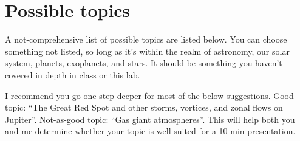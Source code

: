 \documentclass[11pt]{article}%
\begin{document}
\newpage\pagebreak

\section*{Possible topics}

A not-comprehensive list of possible topics are listed below. You can choose something not listed, so long as it's within the realm of astronomy, our solar system, planets, exoplanets, and stars.  It should be something you haven't covered in depth in class or this lab.

I recommend you go one step deeper for most of the below suggestions. Good topic: ``The Great Red Spot and other storms, vortices, and zonal flows on Jupiter''. Not-as-good topic: ``Gas giant atmospheres''. This will help both you and me determine whether your topic is well-suited for a 10 min presentation.
\end{document}
